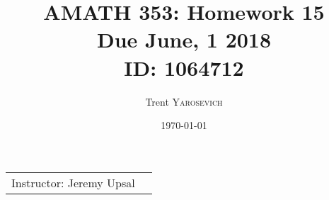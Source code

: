 \documentclass{article}
\title{AMATH 353: Homework 15 \\Due June, 1 2018 \\ ID: 1064712} %
\author{Trent \textsc{Yarosevich}} %
\date{\today} %
\begin{document}
\maketitle %
\setlength\parindent{1cm}

\begin{center}
\begin{tabular}{l r}
Instructor: Jeremy Upsal %
\end{tabular}
\end{center}


\end{document}
